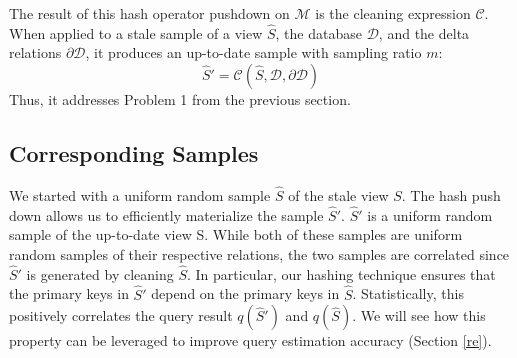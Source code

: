


\vspace{0.25em}

The result of this hash operator pushdown on $\mathcal{M}$ is the cleaning expression $\mathcal{C}$. 
When applied to a stale sample of a view $\widehat{S}$, the database $\mathcal{D}$, and the delta relations $\partial \mathcal{D}$, it produces an up-to-date sample with sampling ratio $m$:
\[
\widehat{S}' = \mathcal{C}(\widehat{S},\mathcal{D},\partial \mathcal{D})
\]
Thus, it addresses Problem 1 from the previous section.

\subsection{Corresponding Samples}
We started with a uniform random sample $\widehat{S}$ of the stale view $S$.
The hash push down allows us to efficiently materialize the sample $\widehat{S}'$.
$\widehat{S}'$ is a uniform random sample of the up-to-date view S.
While both of these samples are uniform random samples of their respective relations, 
the two samples are correlated since $\widehat{S}'$ is generated by cleaning $\widehat{S}$.
In particular, our hashing technique ensures that the primary keys in $\widehat{S}'$ depend on the primary keys in $\widehat{S}$.
Statistically, this positively correlates the query result $q(\widehat{S}')$ and $q(\widehat{S})$. 
We will see how this property can be leveraged to improve query estimation accuracy (Section \ref{re}). 

